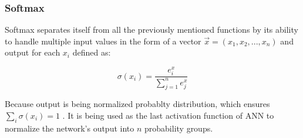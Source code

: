 \subsubsection{Softmax}

Softmax separates itself from all the previously mentioned functions by its ability to handle multiple input values in the form of a vector $\vec{x} = (x_1,x_2,...,x_n)$ and output for each $x_i$ defined as:

\begin{equation}
    {\sigma(x_i) = \frac{e^x_i}{\sum_{j=1}^{n}e^x_j}}
\end{equation}

Because output is being normalized probablty distribution, which ensures $\sum_{i}\sigma(x_i) = 1$ \cite{lipton2015critical}. It is being used as the last activation function of ANN to normalize the network's output into $n$ probability groups.
